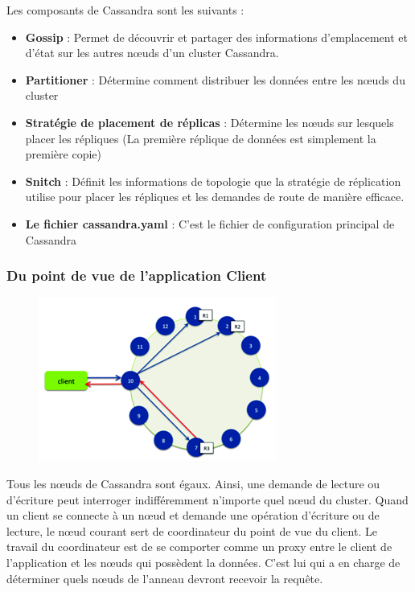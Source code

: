 \documentclass[a4paper, 11pt, titlepage]{article}
\begin{document}
\vspace{5mm}

Les composants de Cassandra sont les suivants :

\begin{itemize}

\item
\textbf{Gossip} : Permet de découvrir et partager des informations d'emplacement et d'état sur les autres nœuds d'un cluster Cassandra.

\item
\textbf{Partitioner} : Détermine comment distribuer les données entre les nœuds du cluster

\item
\textbf{Stratégie de placement de réplicas} : Détermine les nœuds sur lesquels placer les répliques (La première réplique de données est simplement la première copie)

\item
\textbf{Snitch} : Définit les informations de topologie que la stratégie de réplication utilise pour placer les répliques et les demandes de route de manière efficace.

\item
\textbf{Le fichier cassandra.yaml} : C'est le fichier de configuration principal de Cassandra

\end{itemize}



\subsubsection* {Du point de vue de l'application Client}

\begin{figure}
\includegraphics[scale=0.5]{res/cli_cass.png}
\end{figure}

Tous les nœuds de Cassandra sont égaux. Ainsi, une demande de lecture ou d'écriture peut interroger indifféremment n'importe quel nœud du cluster. Quand un client se connecte à un nœud et demande une opération d'écriture ou de lecture, le nœud courant sert de coordinateur du point de vue du client. Le travail du coordinateur est de se comporter comme un proxy entre le client de l'application et les nœuds qui possèdent la données. C'est lui qui a en charge de déterminer quels nœuds de l'anneau devront recevoir la requête.
\end{document}
